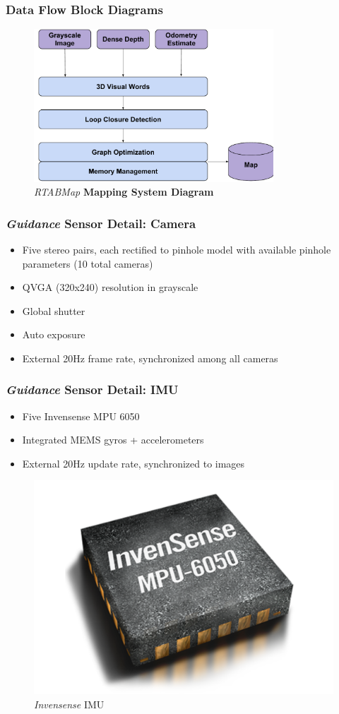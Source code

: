 \documentclass{beamer}
\begin{document}
\begin{frame}
\frametitle{Data Flow Block Diagrams}
\begin{figure}
\vspace{-0.5cm}
\includegraphics[width=0.8\textwidth]{figures/RTABMapBlock}
\caption{\textit{RTABMap} \textbf{ Mapping System Diagram}}
\end{figure}
\end{frame}

\begin{frame}
\frametitle{\textit{Guidance} Sensor Detail: Camera}
\begin{itemize}
\item{Five stereo pairs, each rectified to pinhole model with available pinhole parameters (10 total cameras)}
\item{QVGA (320x240) resolution in grayscale}
\item{Global shutter}
\item{Auto exposure}
\item{External 20Hz frame rate, synchronized among all cameras}
\end{itemize}
\end{frame}

\begin{frame}
\frametitle{\textit{Guidance} Sensor Detail: IMU}
\begin{itemize}
\item{Five Invensense MPU 6050}
\item{Integrated MEMS gyros + accelerometers}
\item{External 20Hz update rate, synchronized to images}
\end{itemize}
\begin{figure}
\includegraphics[width=0.3\linewidth]{figures/imu-6050}
\caption{\textit{Invensense} IMU}
\end{figure}
\end{frame}
\end{document}

